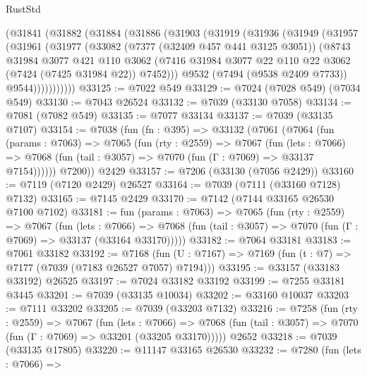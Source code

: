\begin{lexlean}{RustStd}
\begin{coremodule}
    (@31841
      (@31882
        (@31884
          (@31886
            (@31903
              (@31919
                (@31936
                  (@31949
                    (@31957
                      (@31961
                        (@31977
                          (@33082
                            (@7377 (@32409 @457 @441 @3125 @3051))
                            (@8743
                              @31984
                              @3077
                              @421
                              @110
                              @3062
                              (@7416
                                @31984
                                @3077
                                @22
                                @110
                                @22
                                @3062
                                (@7424 (@7425 @31984 @22))
                                @7452)))
                          @9532
                          (@7494 (@9538 @2409 @7733))
                          @9544)))))))))))
@33125 := @7022 @549
@33129 := @7024 (@7028 @549) (@7034 @549)
@33130 := @7043 @26524
@33132 := @7039 (@33130 @7058)
@33134 := @7081 (@7082 @549)
@33135 := @7077 @33134
@33137 := @7039 (@33135 @7107)
@33154 := @7038
    (fun (fn : @395) =>
    @33132
      (@7061
        (@7064
          (fun (params : @7063) =>
          @7065
            (fun (rty : @2559) =>
            @7067
              (fun (lets : @7066) =>
              @7068 (fun (tail : @3057) => @7070 (fun (Γ : @7069) => @33137 @7154))))))
        @7200))
    @2429
@33157 := @7206 (@33130 (@7056 @2429))
@33160 := @7119 (@7120 @2429) @26527
@33164 := @7039 (@7111 (@33160 @7128) @7132)
@33165 := @7145 @2429
@33170 := @7142 (@7144 @33165 @26530 @7100 @7102)
@33181 := fun (params : @7063) =>
  @7065
    (fun (rty : @2559) =>
    @7067
      (fun (lets : @7066) =>
      @7068 (fun (tail : @3057) => @7070 (fun (Γ : @7069) => @33137 (@33164 @33170)))))
@33182 := @7064 @33181
@33183 := @7061 @33182
@33192 := @7168
    (fun (U : @7167) => @7169 (fun (t : @7) => @7177 (@7039 (@7183 @26527 @7057) @7194)))
@33195 := @33157 (@33183 @33192) @26525
@33197 := @7024 @33182 @33192
@33199 := @7255 @33181 @3445
@33201 := @7039 (@33135 @10034)
@33202 := @33160 @10037
@33203 := @7111 @33202
@33205 := @7039 (@33203 @7132)
@33216 := @7258
    (fun (rty : @2559) =>
    @7067
      (fun (lets : @7066) =>
      @7068 (fun (tail : @3057) => @7070 (fun (Γ : @7069) => @33201 (@33205 @33170)))))
    @2652
@33218 := @7039 (@33135 @17805)
@33220 := @11147 @33165 @26530
@33232 := @7280
    (fun (lets : @7066) =>

\end{coremodule}
\end{lexlean}
